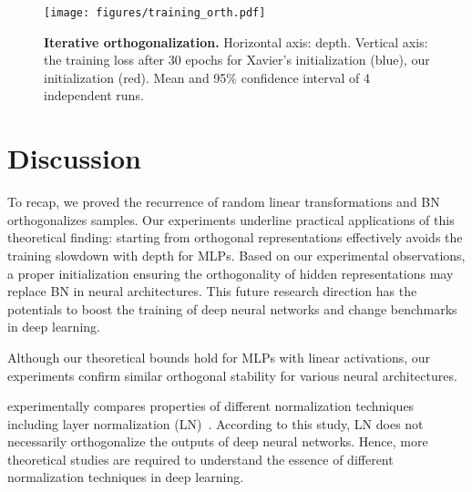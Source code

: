  \begin{figure}[!ht]
     \centering
         \texttt{[image: figures/training\_orth.pdf]}
    \caption{\footnotesize{\textbf{Iterative orthogonalization.} Horizontal axis: depth. Vertical axis: the training loss after 30 epochs for Xavier's initialization (blue), our initialization (red). Mean and 95\% confidence interval of 4 independent runs.}}
        \label{ortho:fig:cifar_orthogonal}
\end{figure}



\section{Discussion}
To recap, we proved the recurrence of random linear transformations and BN orthogonalizes samples. Our experiments underline practical applications of this theoretical finding: starting from orthogonal representations effectively avoids the training slowdown with depth for MLPs. Based on our experimental observations, a proper initialization ensuring the orthogonality of hidden representations may replace BN in neural architectures. This future research direction has the potentials to boost the training of deep neural networks and change benchmarks in deep learning.


Although our theoretical bounds hold for MLPs with linear activations, our experiments confirm similar orthogonal stability for various neural architectures. 

\cite{lubana2021beyond} experimentally compares properties of different normalization techniques including layer normalization (LN)~\citep{ba2016layer}. According to this study,  LN does not necessarily orthogonalize the outputs of deep neural networks. Hence, more theoretical studies are required to understand the essence of different normalization techniques in deep learning.


% 
